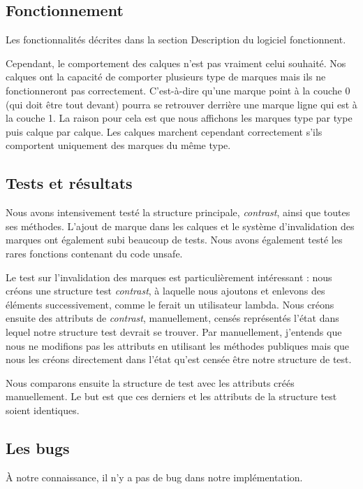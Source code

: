 \documentclass[12pt]{article}
\begin{document}
\subsection{Fonctionnement}

Les fonctionnalités décrites dans la section \og Description du logiciel \fg{} 
fonctionnent.

Cependant, le comportement des calques n'est pas vraiment celui souhaité.
Nos calques ont la capacité de comporter plusieurs type de marques mais ils ne
fonctionneront pas correctement. C'est-à-dire qu'une marque point à la couche 0 (qui
doit être tout devant) pourra se retrouver derrière une marque ligne qui est à la couche 1.
La raison pour cela est que nous affichons les marques type par type puis calque par
calque.
Les  calques marchent cependant correctement s'ils comportent uniquement des marques du même type.

\subsection{Tests et résultats}

Nous avons intensivement testé la structure principale, \textit{contrast}, ainsi que 
toutes ses méthodes.
L'ajout de marque dans les calques et le système d'invalidation des marques ont 
également subi beaucoup de tests.
Nous avons également testé les rares fonctions contenant du code unsafe.

Le test sur l'invalidation des marques est particulièrement intéressant : nous créons
une structure test \textit{contrast}, à laquelle nous ajoutons et enlevons des éléments
successivement, comme le ferait un utilisateur lambda. 
Nous créons ensuite des attributs de \textit{contrast}, manuellement, censés 
représentés l'état dans lequel notre structure test devrait se trouver.
Par manuellement, j'entends que nous ne modifions pas les attributs en utilisant les
méthodes publiques mais que nous les créons directement dans l'état qu'est censée être
notre structure de test.

Nous comparons ensuite la structure de test avec les attributs créés manuellement. Le 
but est que ces derniers et les attributs de la structure test soient identiques. 

\subsection{Les bugs}

À notre connaissance, il n'y a pas de bug dans notre implémentation.
\end{document}
